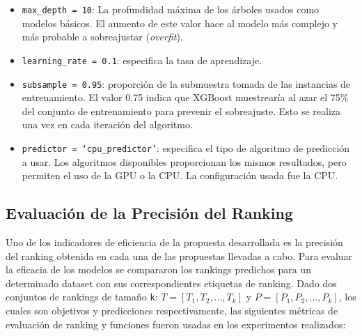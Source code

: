 \begin{description}
\begin{itemize}
		\item \texttt{max\_depth = 10}: La profundidad máxima de los árboles usados como modelos básicos. El aumento de este valor hace al modelo más complejo y más probable a sobreajustar (\textit{overfit}).
		\item \texttt{learning\_rate = 0.1}: especifica la tasa de aprendizaje.
		\item \texttt{subsample = 0.95}: proporción de la submuestra tomada de las instancias de entrenamiento. El valor 0.75 indica que XGBoost muestrearía al azar el 75\% del conjunto de entrenamiento para prevenir el sobreajuste. Esto se realiza una vez en cada iteración del algoritmo.
 		\item \texttt{predictor = `cpu\_predictor'}: especifica el tipo de algoritmo de predicción a usar. Los algoritmos disponibles proporcionan los mismos resultados, pero permiten el uso de la GPU o la CPU. La configuración usada fue la CPU.
	\end{itemize}
\end{description}


\subsection{Evaluación de la Precisión del Ranking}\label{subsec:ranking}

%
%
%

Uno de los indicadores de eficiencia de la propuesta desarrollada es la precisión del ranking obtenida en cada una de las propuestas llevadas a cabo. Para evaluar la eficacia de los modelos se compararon los rankings predichos para un determinado dataset con sus correspondientes etiquetas de ranking. Dado dos conjuntos de rankings de tamaño \texttt{k}: $T = [T_1, T_2, ..., T_k]$ y $P = [P_1, P_2, ..., P_k]$, los cuales son objetivos y predicciones respectivamente, las siguientes métricas de evaluación de ranking y funciones fueron usadas en los experimentos realizados:


